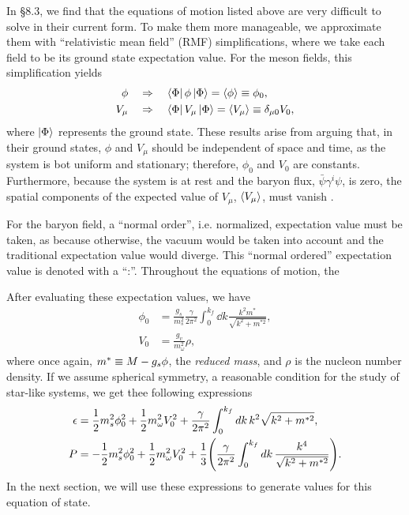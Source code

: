 In \autocite{diener_2008} \S 8.3, we find that the equations of motion listed above are very difficult to solve in their current form. To make them more manageable, we approximate them with ``relativistic mean field'' (RMF) simplifications, where we take each field to be its ground state expectation value. For the meson fields, this simplification yields
\begin{align}
    \phi &\quad\Rightarrow\quad \bra{\Phi} \phi \ket{\Phi} = \expval{\phi} \equiv \phi_0, \\
    V_\mu & \quad\Rightarrow\quad \bra{\Phi} V_\mu \ket{\Phi} = \expval{V_\mu} \equiv \delta_{\mu 0} V_0,
\end{align}
where $\ket{\Phi}$ represents the ground state. These results arise from arguing that, in their ground states, $\phi$ and $V_\mu$ should be independent of space and time, as the system is bot uniform and stationary; therefore, $\phi_0$ and $V_0$ are constants. Furthermore, because the system is at rest and the baryon flux, $\bar\psi\gamma^i\psi$, is zero, the spatial components of the expected value of $V_\mu$, $\expval{V_\mu}$, must vanish \autocite{diener_2008}.

For the baryon field, a ``normal order'', i.e. normalized, expectation value must be taken, as because otherwise, the vacuum would be taken into account and the traditional expectation value would diverge. This ``normal ordered'' expectation value is denoted with a ``:''. Throughout the equations of motion, the 

\medskip
{}
\medskip

After evaluating these expectation values, we have
\begin{align}
    \phi_0 &= \frac{g_s}{m_s^2} \frac{\gamma}{2\pi^2}\int_0^{k_f} \dd{k} \frac{k^2 m^*}{\sqrt{k^2 + m^{*2}}}, \label{eqn: rmf,phi0} \\
    V_0 &= \frac{g_v}{m_\omega^2} \rho, \label{eqn: rmf,V0}
\end{align}
where once again, $m^* \equiv M - g_s \phi$, the \emph{reduced mass}, and $\rho$ is the nucleon number density. If we assume spherical symmetry, a reasonable condition for the study of star-like systems, we get thee following expressions
\begin{align}
    \epsilon & = \frac{1}{2} m_s^2 \phi_0^2 + \frac{1}{2} m_\omega^2 V_0^2 + \frac{\gamma}{2\pi^2} \int_0^{k_f} \dd{k} k^2 \sqrt{k^2 + m^{*2}}, \label{eqn: rmf,eps}\\
    P & = -\frac{1}{2} m_s^2 \phi_0^2 + \frac{1}{2} m_\omega^2 V_0^2 + \frac{1}{3} \pqty{\frac{\gamma}{2\pi^2} \int_0^{k_f} \dd{k}\frac{k^4}{\sqrt{k^2 + m^{*2}}}}. \label{eqn: rmf,p}
\end{align}
In the next section, we will use these expressions to generate values for this equation of state.

